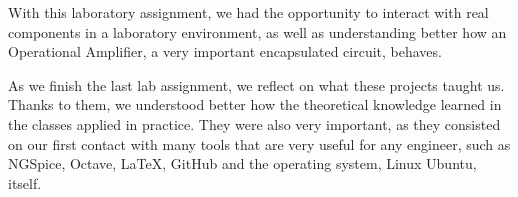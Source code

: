 With this laboratory assignment, we had the opportunity to interact with real components in a laboratory environment, as well as understanding better how an Operational Amplifier, a very important encapsulated circuit, behaves. 

As we finish the last lab assignment, we reflect on what these projects taught us. Thanks to them, we understood better how the theoretical knowledge learned in the classes applied in practice. They were also very important, as they consisted on our first contact with many tools that are very useful for any engineer, such as NGSpice, Octave, LaTeX, GitHub and the operating system, Linux Ubuntu, itself.



